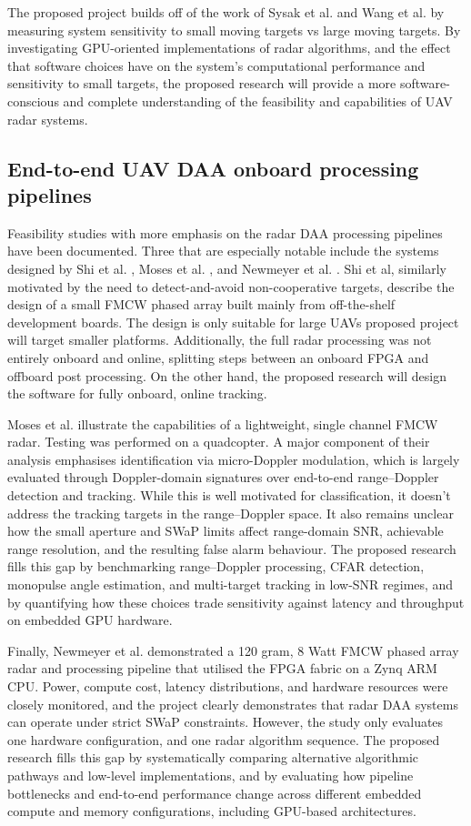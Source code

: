 The proposed project builds off of the work of Sysak et al. and Wang et al. by measuring system sensitivity to small moving targets vs large moving targets. By investigating GPU-oriented implementations of radar algorithms, and the effect that software choices have on the system's computational performance and sensitivity to small targets, the proposed research will provide a more software-conscious and complete understanding of the feasibility and capabilities of UAV radar systems. 

\subsection{End-to-end UAV DAA onboard processing pipelines}
Feasibility studies with more emphasis on the radar DAA processing pipelines have been documented. Three that are especially notable include the systems designed by Shi et al. \cite{6712628}, Moses et al. \cite{6044363}, and Newmeyer et al. \cite{7577322}. Shi et al, similarly motivated by the need to detect-and-avoid non-cooperative targets, describe the design of a small FMCW phased array built mainly from off-the-shelf development boards. The design is only suitable for large UAVs proposed project will target smaller platforms. Additionally, the full radar processing was not entirely onboard and online, splitting steps between an onboard FPGA and offboard post processing. On the other hand, the proposed research will design the software for fully onboard, online tracking. 

Moses et al. illustrate the capabilities of a lightweight, single channel FMCW radar. Testing was performed on a quadcopter. A major component of their analysis emphasises identification via micro-Doppler modulation, which is largely evaluated through Doppler-domain signatures over end-to-end range--Doppler detection and tracking. While this is well motivated for classification, it doesn't address the tracking targets in the  range--Doppler space. It also remains unclear how the small aperture and SWaP limits affect range-domain SNR, achievable range resolution, and the resulting false alarm behaviour. The proposed research fills this gap by benchmarking range--Doppler processing, CFAR detection, monopulse angle estimation, and multi-target tracking in low-SNR regimes, and by quantifying how these choices trade sensitivity against latency and throughput on embedded GPU hardware. 

Finally, Newmeyer et al. demonstrated a 120 gram, 8 Watt FMCW phased array radar and processing pipeline that utilised the FPGA fabric on a Zynq ARM CPU. Power, compute cost, latency distributions, and hardware resources were closely monitored, and the project clearly demonstrates that radar DAA systems can operate under strict SWaP constraints. However, the study only evaluates one hardware configuration, and one radar algorithm sequence. The proposed research fills this gap by systematically comparing alternative algorithmic pathways and low-level implementations, and by evaluating how pipeline bottlenecks and end-to-end performance change across different embedded compute and memory configurations, including GPU-based architectures. 

